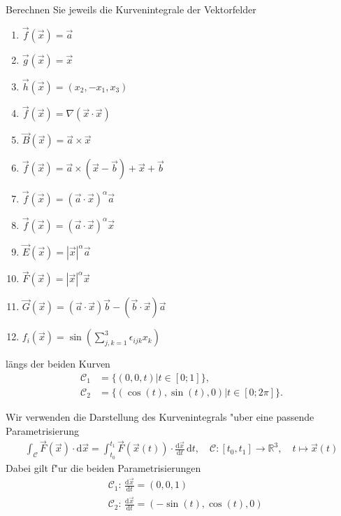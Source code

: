 \documentclass[11pt,answers]{exam}
\begin{document}
\begin{questions}

Berechnen Sie jeweils die Kurvenintegrale der Vektorfelder
\\
\parbox{0.5\textwidth}{\begin{enumerate}
\item $\vec{f}(\vec{x})=\vec{a}$
\item $\vec{g}(\vec{x})=\vec{x}$
\item $\vec{h}(\vec{x})=(x_2,-x_1,x_3)$
\item $\vec{f}(\vec{x})=\nabla(\vec{x}\cdot\vec{x})$
\item $\vec{B}(\vec{x})=\vec{a}\times\vec{x}$
\item $\vec{f}(\vec{x})=\vec{a}\times(\vec{x}-\vec{b})+\vec{x}+\vec{b}$
\end{enumerate}}\parbox{0.5\textwidth}{\begin{enumerate}\setcounter{enumi}{6}
\item $\vec{f}(\vec{x})=(\vec{a}\cdot\vec{x})^\alpha\vec{a}$
\item $\vec{f}(\vec{x})=(\vec{a}\cdot\vec{x})^\alpha\vec{x}$
\item $\vec{E}(\vec{x})=|\vec{x}|^\alpha\vec{a}$
\item $\vec{F}(\vec{x})=|\vec{x}|^\alpha\vec{x}$
\item $\vec{G}(\vec{x})=(\vec{a}\cdot\vec{x})\vec{b}-(\vec{b}\cdot\vec{x})\vec{a}$
\item $f_i(\vec{x})=\sin\left(\sum_{j,k=1}^3\epsilon_{ijk}x_k\right)$
\end{enumerate}}
längs der beiden Kurven
\begin{align*}
\mathcal{C}_1 &= \{(0,0,t)|t\in[0;1]\}, \\
\mathcal{C}_2 &= \{(\cos (t),\sin(t),0)|t\in[0;2\pi]\}.
\end{align*}
\begin{solution}Wir verwenden die Darstellung des 
Kurvenintegrals "uber eine passende Parametrisierung
\begin{align*}
\int_{\mathcal{C}}\vec{F}(\vec{x})\cdot\mathrm d\vec{x}
=
\int_{t_0}^{t_1}\vec{F}(\vec{x}(t))\cdot\frac{\mathrm d\vec{x}}{\mathrm dt}\,\mathrm dt
,\quad
\mathcal{C}:[t_0,t_1]\to\mathbb{R}^3,\quad t\mapsto\vec{x}(t)
\end{align*}
Dabei gilt f"ur die beiden Parametrisierungen
\begin{align*}
&\mathcal{C}_1:\, \frac{\mathrm d\vec{x}}{\mathrm dt}=(0,0,1)
\\
&\mathcal{C}_2:\, \frac{\mathrm d\vec{x}}{\mathrm dt}=(-\sin(t),\cos(t),0)
\end{align*}


\end{solution}
\end{questions}
\end{document}
